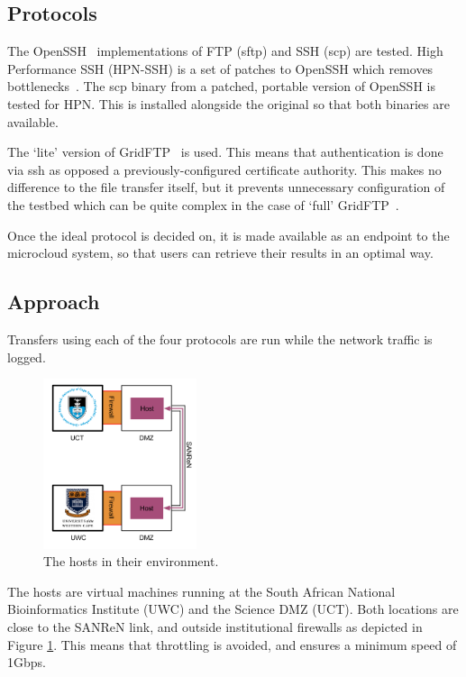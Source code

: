 \documentclass{sig-alternate-05-2015}
\begin{document}
\subsection{Protocols}
The OpenSSH~\cite{openssh} implementations of FTP (sftp) and SSH (scp) are tested. High Performance SSH (HPN-SSH) is a set of patches to OpenSSH which removes bottlenecks~\cite{rapier2008high}. The scp binary from a patched, portable version of OpenSSH is tested for HPN. This is installed alongside the original so that both binaries are available.

The `lite' version of GridFTP~\cite{allcock2005globus} is used. This means that authentication is done via ssh as opposed a previously-configured certificate authority. This makes no difference to the file transfer itself, but it prevents unnecessary configuration of the testbed which can be quite complex in the case of `full' GridFTP~\cite{gridftplite}.

Once the ideal protocol is decided on, it is made available as an endpoint to the microcloud system, so that users can retrieve their results in an optimal way.

\subsection{Approach}
Transfers using each of the four protocols are run while the network traffic is logged.

\begin{figure}[t]
	\centering
	\includegraphics[width=0.4\textwidth]{img/route.png}
	\caption{The hosts in their environment.
	         \label{fig:route}}
\end{figure}

The hosts are virtual machines running at the South African National Bioinformatics Institute (UWC) and the Science DMZ (UCT). Both locations are close to the SANReN link, and outside institutional firewalls as depicted in Figure \ref{fig:route}. This means that throttling is avoided, and ensures a minimum speed of 1Gbps.
\end{document}
